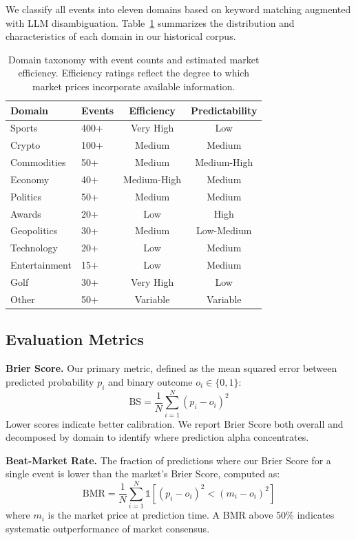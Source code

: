 We classify all events into eleven domains based on keyword matching augmented with LLM disambiguation. Table~\ref{tab:domains} summarizes the distribution and characteristics of each domain in our historical corpus.

\begin{table}[t]
\centering
\caption{Domain taxonomy with event counts and estimated market efficiency. Efficiency ratings reflect the degree to which market prices incorporate available information.}
\label{tab:domains}
\small
\begin{tabular}{@{}llcc@{}}
\toprule
Domain & Events & Efficiency & Predictability \\ \midrule
Sports & 400+ & Very High & Low \\
Crypto & 100+ & Medium & Medium \\
Commodities & 50+ & Medium & Medium-High \\
Economy & 40+ & Medium-High & Medium \\
Politics & 50+ & Medium & Medium \\
Awards & 20+ & Low & High \\
Geopolitics & 30+ & Medium & Low-Medium \\
Technology & 20+ & Low & Medium \\
Entertainment & 15+ & Low & Medium \\
Golf & 30+ & Very High & Low \\
Other & 50+ & Variable & Variable \\
\bottomrule
\end{tabular}
\end{table}

\subsection{Evaluation Metrics}

\textbf{Brier Score.} Our primary metric, defined as the mean squared error between predicted probability $p_i$ and binary outcome $o_i \in \{0, 1\}$:
\begin{equation}
    \text{BS} = \frac{1}{N} \sum_{i=1}^{N} (p_i - o_i)^2
\end{equation}
Lower scores indicate better calibration. We report Brier Score both overall and decomposed by domain to identify where prediction alpha concentrates.

\textbf{Beat-Market Rate.} The fraction of predictions where our Brier Score for a single event is lower than the market's Brier Score, computed as:
\begin{equation}
    \text{BMR} = \frac{1}{N} \sum_{i=1}^{N} \mathbb{1}\left[(p_i - o_i)^2 < (m_i - o_i)^2\right]
\end{equation}
where $m_i$ is the market price at prediction time. A BMR above 50\% indicates systematic outperformance of market consensus.

